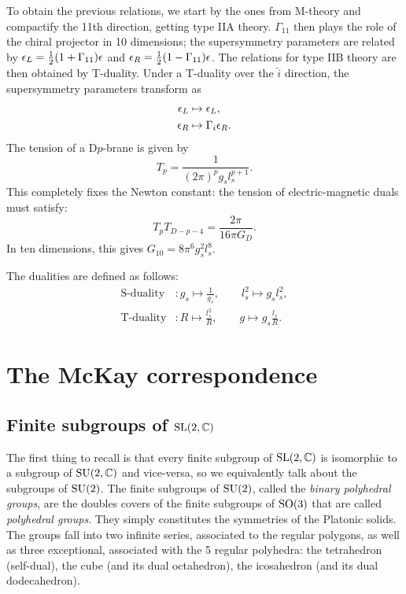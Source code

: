 \documentclass[a4paper,11pt]{article}
\begin{document}
    To obtain the previous relations, we start by the ones from M-theory and compactify the 11th direction, getting type IIA theory. $\Gamma_{11}$ then plays the role of the chiral projector in 10 dimensions; the supersymmetry parameters are related by $\epsilon_L=\frac{1}{2}(1+\Gamma_{11})\epsilon$ and $\epsilon_R=\frac{1}{2}(1-\Gamma_{11})\epsilon$. The relations for type IIB theory are then obtained by T-duality. Under a T-duality over the $\hat{i}$ direction, the supersymmetry parameters transform as
    \begin{align*}
        \epsilon_L &\mapsto \epsilon_L,\\
        \epsilon_R &\mapsto \Gamma_i\epsilon_R.
    \end{align*}
    The tension of a D$p$-brane is given by
    \begin{equation}
        T_{p} = \frac{1}{(2\pi)^pg_sl^{p+1}_s}.
    \end{equation}
    This completely fixes the Newton constant: the tension of electric-magnetic duals must satisfy:
    \begin{equation}
        T_pT_{D-p-4} = \frac{2\pi}{16\pi G_D}.
    \end{equation}
    In ten dimensions, this gives $G_{10}=8\pi^6g^2_sl^8_s$.

    The dualities are defined as follows:
    \begin{align*}
        \text{S-duality} &: g_s\mapsto\frac{1}{g_s},\qquad l^2_s\mapsto g_sl^2_s,\\
        \text{T-duality} &: R\mapsto\frac{l^2_s}{R},\qquad g\mapsto g_s\frac{l_s}{R}.
    \end{align*}

\section{The McKay correspondence}

    \subsection{Finite subgroups of $\text{SL}(2,\mathbb{C})$}

        The first thing to recall is that every finite subgroup of $\text{SL}(2,\mathbb{C})$ is isomorphic to a subgroup of $\text{SU}(2,\mathbb{C})$ and vice-versa, so we equivalently talk about the subgroups of $\text{SU}(2)$. The finite subgroups of $\text{SU}(2)$, called the \emph{binary polyhedral groups}, are the doubles covers of the finite subgroups of $\text{SO}(3)$ that are called \emph{polyhedral groups}. They simply constitutes the symmetries of the Platonic solids. The groups fall into two infinite series, associated to the regular polygons, as well as three exceptional, associated with the 5 regular polyhedra: the tetrahedron (self-dual), the cube (and its dual octahedron), the icosahedron (and its dual dodecahedron).
\end{document}
